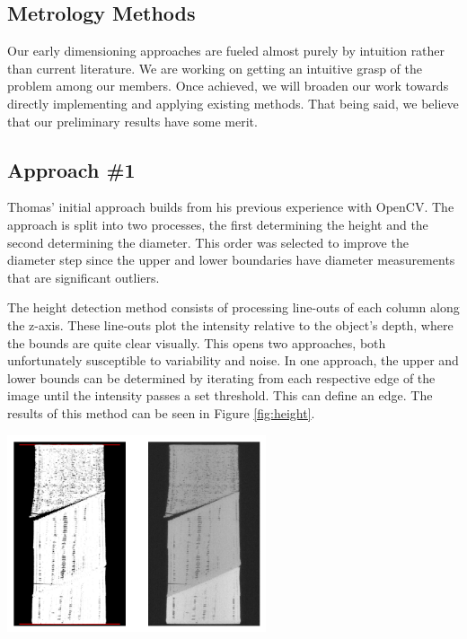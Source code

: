 \documentclass[11pt, letterpaper, notitlepage]{article}
\newenvironment{Figure}
  {\par\medskip\noindent\minipage{\linewidth}}
  {\endminipage\par\medskip}
\begin{document}
\begin{multicols}{2}
\section{Metrology Methods}
Our early dimensioning approaches are fueled almost purely by intuition rather than current literature. We are working on getting an intuitive grasp of the problem among our members. Once achieved, we will broaden our work towards directly implementing and applying existing methods. That being said, we believe that our preliminary results have some merit.

\subsection{Approach \#1}
Thomas' initial approach builds from his previous experience with OpenCV\cite{opencv_library}. The approach is split into two processes, the first determining the height and the second determining the diameter. This order was selected to improve the diameter step since the upper and lower boundaries have diameter measurements that are significant outliers.

The height detection method consists of processing line-outs of each column along the z-axis. These line-outs plot the intensity relative to the object's depth, where the bounds are quite clear visually. This opens two approaches, both unfortunately susceptible to variability and noise. In one approach, the upper and lower bounds can be determined by iterating from each respective edge of the image until the intensity passes a set threshold. This can define an edge. The results of this method can be seen in Figure \ref{fig:height}.

\begin{Figure}
  \centering
  \includegraphics[width=3in]{images/height-fit.png}
  \label{fig:height}
\end{Figure}


\end{multicols}
\end{document}
